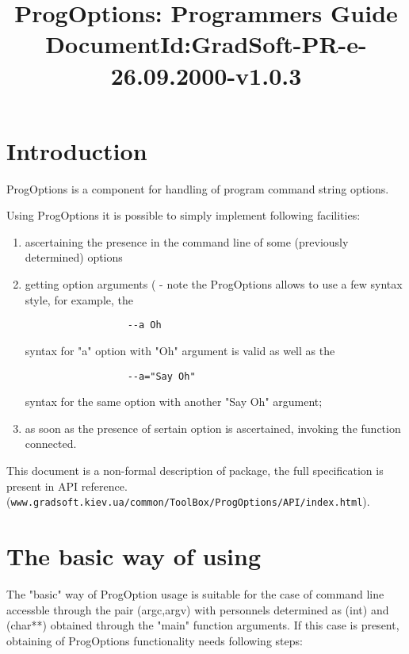 \documentclass[10pt]{article}
\title{ ProgOptions: Programmers Guide  
       \newline
       \small{DocumentId:GradSoft-PR-e-26.09.2000-v1.0.3} 
      }
\begin{document}
\maketitle{}

\tableofcontents

\section{ Introduction }

 ProgOptions is a component for handling of program command string options.

 Using ProgOptions it is possible to simply implement following facilities:
 \begin{enumerate}
    \item ascertaining the presence in the command line of some (previously determined) options
    \item getting option arguments ( - note the ProgOptions allows to use a few syntax style,
          for example, the
\begin{verbatim}
                  --a Oh 
\end{verbatim}
          syntax for "a" option with "Oh" argument is valid as well as the
\begin{verbatim}
                  --a="Say Oh"
\end{verbatim}
          syntax for the same option with another "Say Oh" argument;
    \item as soon as the presence of sertain option is ascertained, invoking the function connected.
 \end{enumerate}


 This document is a non-formal description of package, the full specification is present in
 API reference. \\
 (\verb|www.gradsoft.kiev.ua/common/ToolBox/ProgOptions/API/index.html|).

\section{ The basic way of using }
\label{base}

 The "basic" way of ProgOption usage is suitable for the case of command line accessble through
 the pair (argc,argv) with personnels determined as (int) and (char**) obtained through the "main"
 function arguments.
 If this case is present, obtaining of ProgOptions functionality needs following steps:
\end{document}
